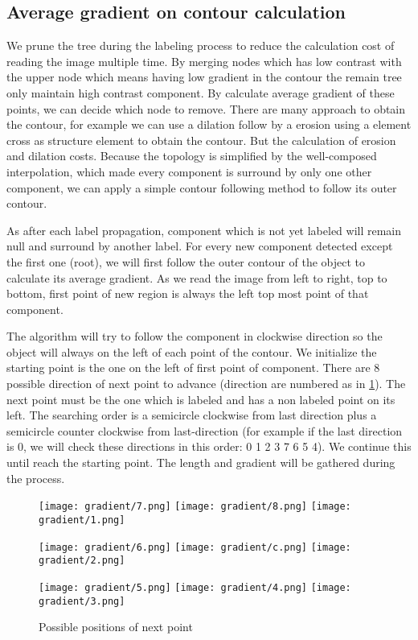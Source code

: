 \subsection{Average gradient on contour calculation} \label{subsec:ContourFollowing}
\par We prune the tree during the labeling process to reduce the calculation cost of reading the image multiple time. By merging nodes which has low contrast with the upper node which means having low gradient in the contour the remain tree only maintain high contrast component. By calculate average gradient of these points, we can decide which node to remove. There are many approach to obtain the contour, for example we can use a dilation follow by a erosion using a element cross as structure element to obtain the contour. But the calculation of erosion and dilation costs. Because the topology is simplified by the well-composed interpolation, which made every component is surround by only one other component, we can apply a simple contour following method to follow its outer contour.
\par As after each label propagation, component which is not yet labeled will remain null and surround by another label. For every new component detected except the first one (root), we will first follow the outer contour of the object to calculate its average gradient. As we read the image from left to right, top to bottom, first point of new region is always the left top most point of that component. 

The algorithm will try to follow the component in clockwise direction so the object will always on the left of each point of the contour. We initialize the starting point is the one on the left of first point of component. There are 8 possible direction of next point to advance (direction are numbered as in \ref{fig:directionToSearch}). The next point must be the one which is labeled and has a non labeled point on its left. The searching order is a semicircle clockwise from last direction plus a semicircle counter clockwise from last-direction (for example if the last direction is 0, we will check these directions in this order: 0 1 2 3 7 6 5 4). We continue this until reach the starting point. The length and gradient will be gathered during the process. 

\begin{figure}
\texttt{[image: gradient/7.png]}
\texttt{[image: gradient/8.png]}
\texttt{[image: gradient/1.png]}
\centering

\texttt{[image: gradient/6.png]}
\texttt{[image: gradient/c.png]}
\texttt{[image: gradient/2.png]}
\centering

\texttt{[image: gradient/5.png]}
\texttt{[image: gradient/4.png]}
\texttt{[image: gradient/3.png]}
\centering
\caption{Possible positions of next point}
\label{fig:directionToSearch}
\end{figure}


